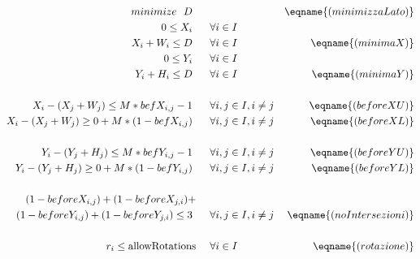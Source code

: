 \begin{align*}	%
%
%
minimize \ \ D       \ \ \ \ \   &   & \eqname{(minimizzaLato)} \\	%
%
0 \leq X_i           \ \ \ \ \   & \fori{} \\
X_i +W_i \leq D      \ \ \ \ \   & \fori{} & \eqname{(minimaX)} \\
0 \leq Y_i           \ \ \ \ \   & \fori{} \\
Y_i +H_i \leq D      \ \ \ \ \   & \fori{} & \eqname{(minimaY)} \\
\\
%
%
%
%
X_i - (X_j + W_j) \leq M *befX_{i,j} -1           \ \ \ \ \   &\forij{} &\eqname{(beforeXU)} \\
X_i - (X_j + W_j) \geq 0 + M*(1-befX_{i,j})       \ \ \ \ \   &\forij{} &\eqname{(beforeXL)} \\ \\
%
%
Y_i - (Y_j + H_j) \leq M *befY_{i,j} -1           \ \ \ \ \   &\forij{} &\eqname{(beforeYU)} \\
Y_i - (Y_j + H_j) \geq 0 + M*(1-befY_{i,j})       \ \ \ \ \   &\forij{} &\eqname{(beforeYL)} \\ \\
%
%
(1-beforeX_{i,j})+(1-beforeX_{j,i})+ \ \ \ \ & \\
(1-beforeY_{i,j})+(1-beforeY_{j,i}) \leq 3       \ \ \ \ \   & \forij{} & \eqname{(noIntersezioni)} \\ \\
%
%
r_i \leq \text{allowRotations} \ \ \ \ & \fori{} &\eqname{(rotazione)} \\

\end{align*}
